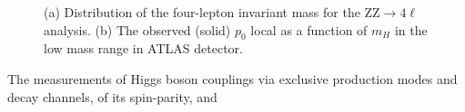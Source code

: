 \begin{figure}
\centering%
\caption{(a) Distribution of the four-lepton invariant mass for the ZZ$\to 4 \ell$ analysis.  (b) The observed (solid) $p_0$ local as a function of $m_H$ in the low mass range in ATLAS detector. }
\label{disc_hig}
\end{figure}
The measurements of Higgs boson couplings via exclusive production modes and decay channels, of its spin-parity, and
